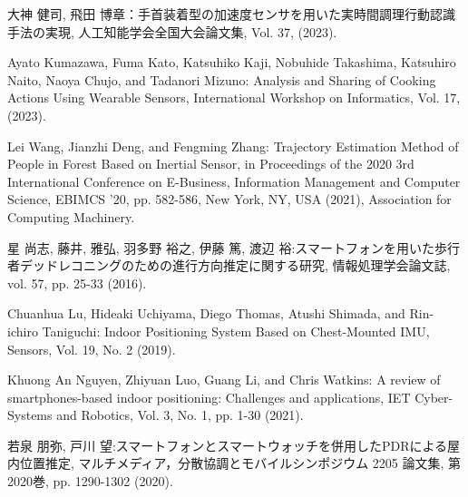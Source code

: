 \begin{thebibliography}{参考文献}
	大神 健司, 飛田 博章：手首装着型の加速度センサを用いた実時間調理行動認識手法の実現, 人工知能学会全国大会論文集, Vol. 37, (2023).

	Ayato Kumazawa, Fuma Kato, Katsuhiko Kaji, Nobuhide Takashima, Katsuhiro Naito, Naoya Chujo, and Tadanori Mizuno:
	Analysis and Sharing of Cooking Actions Using Wearable Sensors, International Workshop on Informatics, Vol. 17, (2023).

	Lei Wang, Jianzhi Deng, and Fengming Zhang: Trajectory Estimation Method of People in Forest Based on Inertial Sensor, in Proceedings of the 2020 3rd International Conference on E-Business, Information Management and Computer Science, EBIMCS ’20, pp. 582-586, New York, NY, USA (2021), Association for Computing Machinery.

	星 尚志, 藤井, 雅弘, 羽多野 裕之, 伊藤 篤, 渡辺 裕:スマートフォンを用いた歩行者デッドレコニングのための進行方向推定に関する研究, 情報処理学会論文誌, vol. 57, pp. 25-33 (2016).

	Chuanhua Lu, Hideaki Uchiyama, Diego Thomas, Atushi Shimada, and Rin-ichiro Taniguchi: Indoor Positioning System Based on Chest-Mounted IMU, Sensors, Vol. 19, No. 2 (2019).

	Khuong An Nguyen, Zhiyuan Luo, Guang Li, and Chris Watkins: A review of smartphones-based indoor positioning: Challenges and applications, IET Cyber-Systems and Robotics, Vol. 3, No. 1, pp. 1-30 (2021).

	若泉 朋弥, 戸川 望:スマートフォンとスマートウォッチを併用したPDRによる屋内位置推定, マルチメディア，分散協調とモバイルシンポジウム 2205 論文集, 第2020巻, pp. 1290-1302 (2020).



\end{thebibliography}

